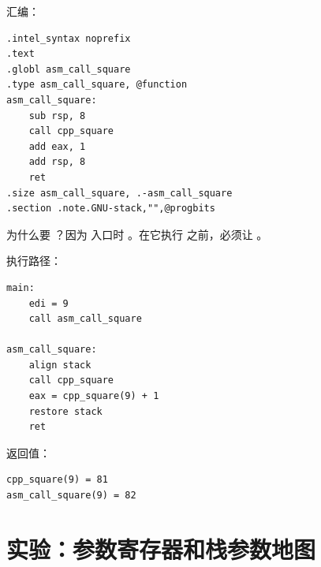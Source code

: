汇编：

\begin{lstlisting}
.intel_syntax noprefix
.text
.globl asm_call_square
.type asm_call_square, @function
asm_call_square:
    sub rsp, 8
    call cpp_square
    add eax, 1
    add rsp, 8
    ret
.size asm_call_square, .-asm_call_square
.section .note.GNU-stack,"",@progbits
\end{lstlisting}

为什么要 ？因为  入口时 。在它执行   之前，必须让 。

执行路径：

\begin{lstlisting}
main:
    edi = 9
    call asm_call_square

asm_call_square:
    align stack
    call cpp_square
    eax = cpp_square(9) + 1
    restore stack
    ret
\end{lstlisting}

返回值：

\begin{lstlisting}
cpp_square(9) = 81
asm_call_square(9) = 82
\end{lstlisting}

\section{实验：参数寄存器和栈参数地图}

